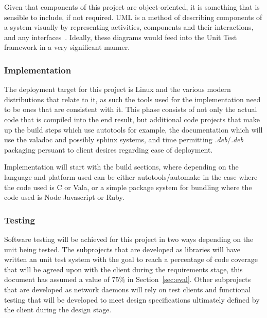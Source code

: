 \documentclass[11pt]{article}
\begin{document}
          Given that components of this project are object-oriented, it is
          something that is sensible to include, if not required. UML is a method
          of describing components of a system visually by representing
          activities, components and their interactions, and any
          interfaces~. Ideally, these diagrams would feed
          into the Unit Test framework in a very significant manner.

        \subsubsection{Implementation}\label{sec:soln-model-implementation}

          The deployment target for this project is Linux and the various modern
          distributions that relate to it, as such the tools used for the
          implementation need to be ones that are consistent with it. This phase
          consists of not only the actual code that is compiled into the end
          result, but additional code projects that make up the build steps which
          use autotools for example, the documentation which will use the valadoc
          and possibly sphinx systems, and time permitting \emph{.deb}/\emph{.deb}
          packaging persuant to client desires regarding ease of deployment.

          Implementation will start with the build sections, where depending on
          the language and platform used can be either autotools/automake in the
          case where the code used is C or Vala, or a simple package system for
          bundling where the code used is Node Javascript or Ruby.

        \subsubsection{Testing}\label{sec:soln-model-testing}

          Software testing will be achieved for this project in two ways
          depending on the unit being tested. The subprojects that are developed
          as libraries will have written an unit test system with the goal to
          reach a percentage of code coverage that will be agreed upon with the
          client during the requirements stage, this document has assumed a value
          of 75$\%$ in Section~\ref{sec:eval}. Other subprojects that are
          developed as network daemons will rely on test clients and functional
          testing that will be developed to meet design specifications ultimately
          defined by the client during the design stage.
\end{document}
